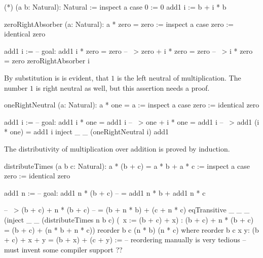 \begin{alba}
  (*) (a b: Natural): Natural :=
    inspect a case
        0 :=
            0
        add1 i :=
            b + i * b
\end{alba}

\begin{alba}
    zeroRightAbsorber (a: Natural): a * zero = zero :=
        inspect a case
            zero :=
                identical zero

            add1 i :=
                -- goal: add1 i * zero = zero
                -- ~>    zero + i * zero = zero
                -- ~>    i * zero = zero
                zeroRightAbsorber i
\end{alba}

By substitution is is evident, that $1$ is the left neutral of
multiplication. The number $1$ is right neutral as well, but this assertion
needs a proof.

\begin{alba}
    oneRightNeutral (a: Natural): a * one = a :=
        inspect a case
            zero :=
                identical zero

            add1 i :=
                -- goal:  add1 i * one = add1 i
                -- ~>     one + i * one = add1 i
                -- ~>     add1 (i * one) = add1 i
                inject _ _
                    (oneRightNeutral i)
                    add1
\end{alba}


The distributivity of multiplication over addition is proved by induction.
%
\begin{alba}
    distributeTimes (a b c: Natural): a * (b + c) = a * b + a * c :=
        inspect a case
            zero :=
                identical zero

            add1 n :=
                -- goal:  add1 n * (b + c)
                --        = add1 n * b + add1 n * c

                -- ~>     (b + c) + n * (b + c)
                --        = (b + n * b) + (c + n * c)
                eqTransitive _ _ _
                    (inject _ _
                        (distributeTimes n b c)
                        (\ x := (b + c) + x)
                        : (b + c) + n * (b + c) = (b + c) + (n * b + n * c))
                    reorder b c (n * b) (n * c)
                where
                    reorder b c x y: (b + c) + x + y = (b + x) + (c + y)
                    :=
                        -- reordering manually is very tedious
                        -- must invent some compiler support
                        ??
\end{alba}

